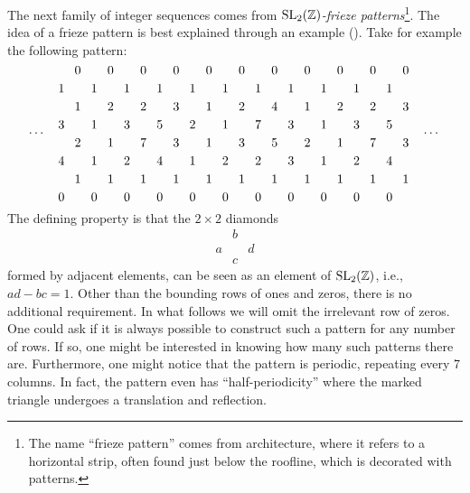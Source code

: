 The next family of integer sequences comes from \emph{$\operatorname{SL}_2(\mathbb{Z})$-frieze
	patterns}\footnote{The name ``frieze pattern'' comes from architecture, where it refers
	to a horizontal strip, often found just below the roofline, which is decorated with
	patterns.}. The idea of a frieze pattern is best explained
through an example (\cite{Coxeter1971FriezePatterns}). Take for example the following
pattern:
\begin{equation*}
	\dots\quad
	\begin{tikzcd}[
			sep = 0.2em, cramped,
		]
		&0&&0&&0&&0&&0&&0&&0&&0&&0&&0&&0\\
		1&&1&&1&&1&&1&&1&&1&&1&&1&&1&&1\\
		&1&&2&&2&&3&&1&&2&&4&&1&&2&&2&&3\\
		3&&1&&3&&5&&2&&1&&7&&3&&1&&3&&5\\
		&2&&1&&7&&3&&1&&3&&5&&2&&1&&7&&3\\
		4&&1&&2&&4&&1&&2&&2&&3&&1&&2&&4\\
		&1&&1&&1&&1&&1&&1&&1&&1&&1&&1&&1\\
		0&&0&&0&&0&&0&&0&&0&&0&&0&&0&&0
	\end{tikzcd}
	\quad
	\dots
\end{equation*}
The defining property is that the $2 \times 2$ diamonds
\begin{equation*}
	\begin{matrix}
		  & b &   \\
		a &   & d \\
		  & c &
	\end{matrix}
\end{equation*}
formed by adjacent elements, can be seen as an element of $\operatorname{SL}_2 (\mathbb{Z})$, i.e., $ad - bc = 1$. Other than the bounding rows of ones and zeros, there is no additional requirement. In what follows we will omit the irrelevant row of zeros. One could ask if it is always possible to construct such a pattern for any number of rows. If so, one might be interested in knowing how many such patterns there are. Furthermore, one might notice that the pattern is periodic, repeating every 7 columns. In fact, the pattern even has ``half-periodicity'' where the marked triangle undergoes a translation and reflection.
